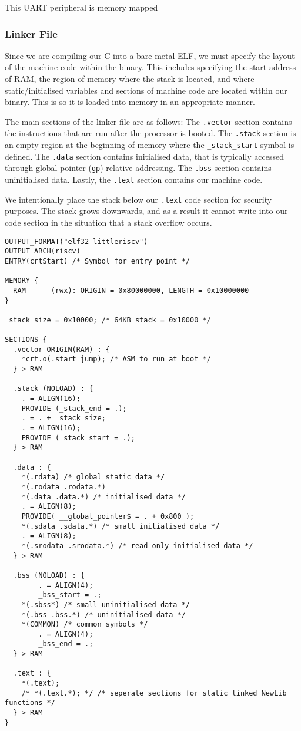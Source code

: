 \documentclass[a4paper,8pt]{report}
\begin{document}
This UART peripheral is memory mapped 


\subsubsection{Linker File}
Since we are compiling our C into a bare-metal ELF, we must specify the layout
of the machine code within the binary. This includes specifying the start
address of RAM, the region of memory where the stack is located, and where
static/initialised variables and sections of machine code are located within our
binary. This is so it is loaded into memory in an appropriate manner.

The main sections of the linker file are as follows: The \texttt{.vector}
section contains the instructions that are run after the processor is booted.
The \texttt{.stack} section is an empty region at the beginning of memory
where the \texttt{\_stack\_start} symbol is defined. The \texttt{.data} section
contains initialised data, that is typically accessed through global pointer
(\texttt{gp}) relative addressing. The \texttt{.bss} section contains
uninitialised data. Lastly, the \texttt{.text} section contains our machine
code.

We intentionally place the stack below our \texttt{.text} code section for security
purposes. The stack grows downwards, and as a result it cannot write into our
code section in the situation that a stack overflow occurs.

\scriptsize
\begin{verbatim}
OUTPUT_FORMAT("elf32-littleriscv")
OUTPUT_ARCH(riscv)
ENTRY(crtStart) /* Symbol for entry point */

MEMORY {
  RAM      (rwx): ORIGIN = 0x80000000, LENGTH = 0x10000000
}

_stack_size = 0x10000; /* 64KB stack = 0x10000 */

SECTIONS {
  .vector ORIGIN(RAM) : {
    *crt.o(.start_jump); /* ASM to run at boot */
  } > RAM

  .stack (NOLOAD) : {
    . = ALIGN(16);
    PROVIDE (_stack_end = .);
    . = . + _stack_size;
    . = ALIGN(16);
    PROVIDE (_stack_start = .);
  } > RAM

  .data : {
    *(.rdata) /* global static data */
    *(.rodata .rodata.*)
    *(.data .data.*) /* initialised data */
    . = ALIGN(8);
    PROVIDE( __global_pointer$ = . + 0x800 );
    *(.sdata .sdata.*) /* small initialised data */
    . = ALIGN(8);
    *(.srodata .srodata.*) /* read-only initialised data */
  } > RAM

  .bss (NOLOAD) : {
		. = ALIGN(4);
		_bss_start = .;
    *(.sbss*) /* small uninitialised data */
    *(.bss .bss.*) /* uninitialised data */
    *(COMMON) /* common symbols */
		. = ALIGN(4);
		_bss_end = .;
  } > RAM

  .text : {
    *(.text);
    /* *(.text.*); */ /* seperate sections for static linked NewLib functions */
  } > RAM
}
\end{verbatim}
\normalsize
\end{document}
